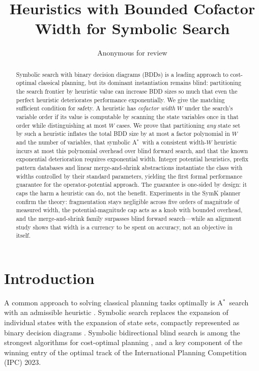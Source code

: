 \documentclass[letterpaper]{article}
\title{Heuristics with Bounded Cofactor Width for Symbolic Search}
\author{Anonymous for review}
\date{}
\newcommand{\astar}{A\ensuremath{^{*}}}
\theoremstyle{plain}
\theoremstyle{definition}
\theoremstyle{remark}
\begin{document}
\maketitle

\begin{abstract}
Symbolic search with binary decision diagrams (BDDs) is a leading
approach to cost-optimal classical planning, but its dominant
instantiation remains blind: partitioning the search frontier by
heuristic value can increase BDD sizes so much that even the perfect
heuristic deteriorates performance exponentially. We give the matching
sufficient condition for safety. A heuristic has \emph{cofactor width}
$W$ under the search's variable order if its value is computable by
scanning the state variables once in that order while distinguishing at
most $W$ cases. We prove that partitioning \emph{any} state set by such
a heuristic inflates the total BDD size by at most a factor polynomial
in $W$ and the number of variables, that symbolic \astar\ with a
consistent width-$W$ heuristic incurs at most this polynomial overhead
over blind forward search, and that the known exponential deterioration
requires exponential width. Integer potential heuristics, prefix pattern
databases and linear merge-and-shrink abstractions instantiate the class
with widths controlled by their standard parameters, yielding the first
formal performance guarantee for the operator-potential approach. The
guarantee is one-sided by design: it caps the harm a heuristic can do,
not the benefit.
Experiments in the SymK planner confirm the theory: fragmentation stays
negligible across five orders of magnitude of measured width, the
potential-magnitude cap acts as a knob with bounded overhead, and the
merge-and-shrink family surpasses blind forward search---while an
alignment study shows that width is a currency to be spent on accuracy,
not an objective in itself.
\end{abstract}

\section{Introduction}

A common approach to solving classical planning tasks optimally is
\astar\ search \citep{hart-et-al-ieeessc1968} with an admissible heuristic
\citep{pearl-1984}. Symbolic search
\citep{mcmillan-1993,edelkamp-helmert-ecp1999} replaces the expansion of
individual states with the expansion of state sets, compactly represented
as binary decision diagrams \citep[BDDs;][]{bryant-ieeecomp1986}. Symbolic
bidirectional blind search is among the strongest algorithms for
cost-optimal planning
\citep{torralba-et-al-aij2017,speck-et-al-jair2025}, and a key component
of the winning entry of the optimal track of the International Planning
Competition (IPC) 2023.
\end{document}
